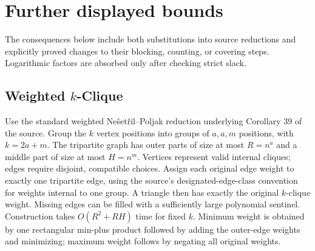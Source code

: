 \documentclass[11pt]{article}
\begin{document}
\section{Further displayed bounds}
\label{sec:further}
The consequences below include both substitutions into source reductions
and explicitly proved changes to their blocking, counting, or covering
steps. Logarithmic factors are absorbed only after checking strict slack.

\subsection*{Weighted $k$-Clique}
Use the standard weighted Ne\v{s}et\v{r}il--Poljak reduction underlying
Corollary 39 of the source. Group the $k$ vertex positions into groups of
$a,a,m$ positions, with $k=2a+m$. The tripartite graph has outer parts of
size at most $R=n^a$ and a middle part of size at most $H=n^m$.
Vertices represent valid internal cliques; edges require disjoint,
compatible choices. Assign each original edge weight to exactly one
tripartite edge, using the source's designated-edge-class convention for
weights internal to one group. A triangle then has exactly the original
$k$-clique weight. Missing edges can be filled with a sufficiently large
polynomial sentinel. Construction takes $O(R^2+RH)$ time for fixed $k$.
Minimum weight is obtained by one rectangular min-plus product followed
by adding the outer-edge weights and minimizing; maximum weight follows
by negating all original weights.
\end{document}

